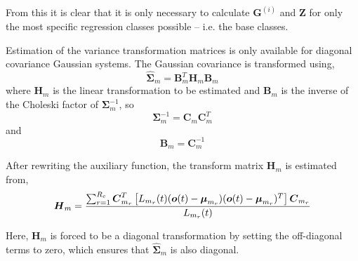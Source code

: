 From this it is clear that it is only necessary to calculate
$\bm{G}^{(i)}$ and $\bm{Z}$ for only the most specific regression
classes possible -- i.e. the base classes.


Estimation of the variance transformation matrices is only available
for diagonal covariance Gaussian systems. The Gaussian covariance is
transformed using,
\[
        \hat{\bm{\Sigma}}_{m} = \bm{B}_m^T\bm{H}_m\bm{B}_m
\]
where $\bm{H}_m$ is the linear transformation to be estimated and
$\bm{B}_m$ is the inverse of the Choleski factor of $\bm{\Sigma}_{m}^{-1}$,
so
\[ 
        \bm{\Sigma}_{m}^{-1} = \bm{C}_m\bm{C}_m^T
\]
and
\[
        \bm{B}_m = \bm{C}_m^{-1}
\]

After rewriting the auxiliary function, the transform matrix $\bm{H}_m$
is estimated from,
\[
        {\mbox{\boldmath $H$}}_m = \frac{ \sum_{r=1}^{R_c}{\mbox{\boldmath $C$}}_{m_r}^T 
                          \left[
                            L_{m_r}(t)({\mbox{\boldmath $o$}}(t) - {\mbox{\boldmath $\mu$}}_{m_r})
                                   ({\mbox{\boldmath $o$}}(t) - {\mbox{\boldmath $\mu$}}_{m_r})^T
                          \right]
                          {\mbox{\boldmath $C$}}_{m_r}
                        }
                        { L_{m_r}(t) }
\]

Here, $\bm{H}_m$ is forced to be a diagonal transformation by setting
the off-diagonal terms to zero, which ensures that
$\hat{\bm{\Sigma}}_{m}$ is also diagonal.



